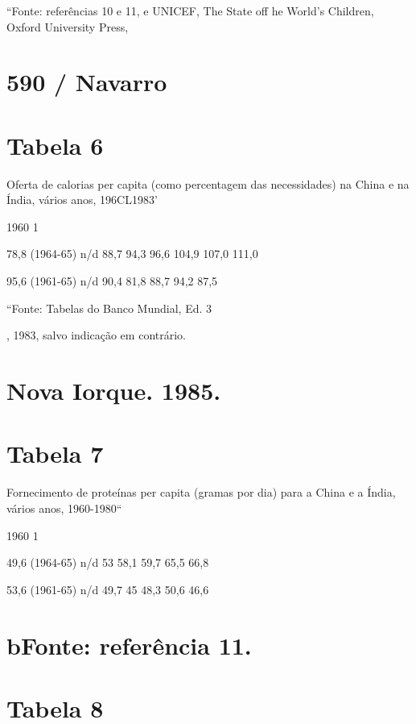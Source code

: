 {{{ \par 
“Fonte: referências {\color{blue}10} e 11, e UNICEF, The State off he World’s Children, Oxford University Press,
 \par 
\section{590 / Navarro}
 \par 
\section{Tabela 6}
 \par 
Oferta de calorias per capita (como percentagem das necessidades) na China e na Índia, vários anos, 196CL1983'
 \par 
1960 1%
 \par 
78,8 (1964-65) n/d 88,7 94,3 96,6 104,9 107,0 111,0
 \par 
95,6 (1961-65) n/d 90,4 81,8 88,7 94,2 87,5 %
 \par 
“Fonte: Tabelas do Banco Mundial, Ed. {\color{blue} 3 } {\par} , 1983, salvo indicação em contrário.
 \par 
\section{Nova Iorque. 1985.}
 \par 
\section{Tabela 7}
 \par 
Fornecimento de proteínas per capita (gramas por dia) para a China e a Índia, vários anos, 1960-1980“
 \par 
1960 1%
 \par 
49,6 (1964-65) n/d {\color{blue}53} 58,1 59,7 65,5 66,8
 \par 
53,6 (1961-65) n/d 49,7 {\color{blue}45} 48,3 50,6 46,6
 \par 
\section{bFonte: referência 11.}
 \par 
\section{Tabela 8}
 \par 
}}}
